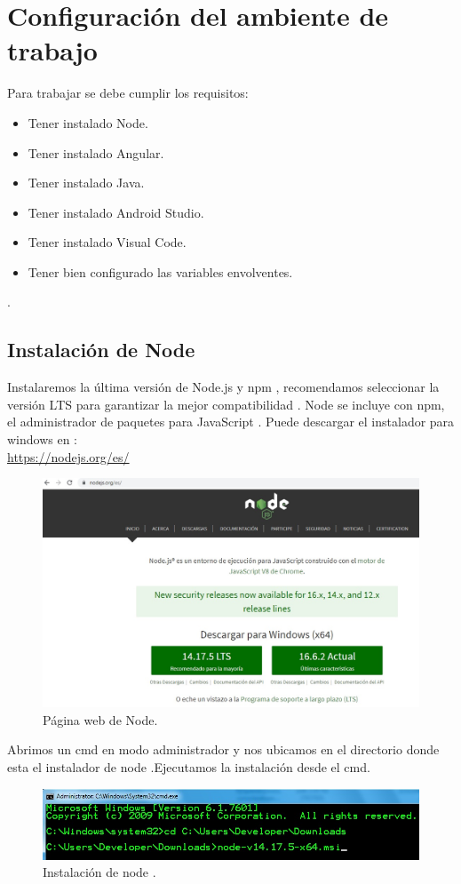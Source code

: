 \chapter{Configuraci\'on del ambiente de trabajo}
Para trabajar se debe cumplir los requisitos:
\begin{itemize}
	\item Tener instalado Node.
	\item Tener instalado Angular.
	\item Tener instalado Java.
	\item Tener instalado Android Studio.
	\item Tener instalado Visual Code.
	\item Tener bien configurado las variables envolventes.
\end{itemize}
.\\

\section{Instalaci\'on de Node}
Instalaremos  la \'ultima versi\'on de Node.js y npm , recomendamos seleccionar
 la versi\'on LTS para garantizar la mejor compatibilidad . Node se incluye con
  npm, el administrador de paquetes para JavaScript .
Puede descargar el instalador para windows en :\\
\url{https://nodejs.org/es/}\\
\begin{figure}[H] %
	\centering %
	\includegraphics[scale=0.5]{figuras/fig_1_1.jpg}
	\caption{P\'agina web de Node.}
\end{figure}

Abrimos un cmd en modo administrador y nos ubicamos en el directorio donde esta el instalador de node .Ejecutamos la instalaci\'on desde el cmd.
\begin{figure}[H] %
	\centering %
	\includegraphics[scale=0.8]{figuras/fig_1_2.jpg}
	\caption{Instalaci\'on de node .}
\end{figure}

